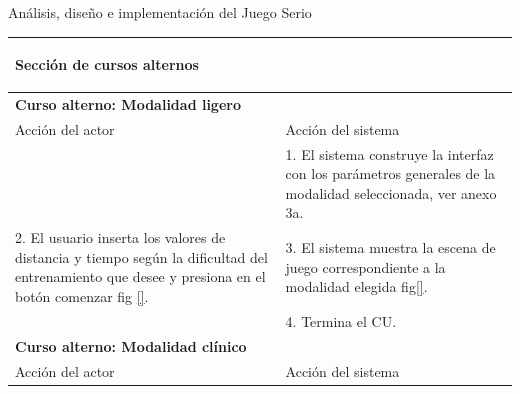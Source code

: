 \begin{thesischapter}{2} {Análisis, diseño e implementación del Juego Serio}
\begin{center}
\begin{table}
\begin{tabularx}{\textwidth}{|X|X|}
                \multicolumn{2}{|X|}{        
                \begin{minipage}[t]{0.925\columnwidth}
                    \begin{center}
                        \textbf{Sección de cursos alternos}
                    \end{center}
                \end{minipage}} \\\hline
                \multicolumn{2}{|X|}{        
                \begin{minipage}[t]{0.925\columnwidth}
                        \textbf{Curso alterno: Modalidad ligero}
                \end{minipage}} \\\hline
                
                Acción del actor & Acción del sistema \\\hline
             
                & 
                1. El sistema construye la interfaz con los parámetros generales de la modalidad seleccionada, ver anexo 3a. \\\hline
                2. El usuario inserta los valores de distancia y tiempo según la dificultad del entrenamiento que desee y presiona en el botón comenzar fig \ref{}. 
                & 
                3. El sistema muestra la escena de juego correspondiente a la modalidad elegida fig\ref{}. \\ &4. Termina el CU. \\\hline
                
                \multicolumn{2}{|X|}{        
                \begin{minipage}[t]{0.925\columnwidth}
                        \textbf{Curso alterno: Modalidad clínico}
                \end{minipage}} \\\hline
                
                Acción del actor & Acción del sistema \\\hline
                 

\end{tabularx}
\end{table}
\end{center}
\end{thesischapter}
